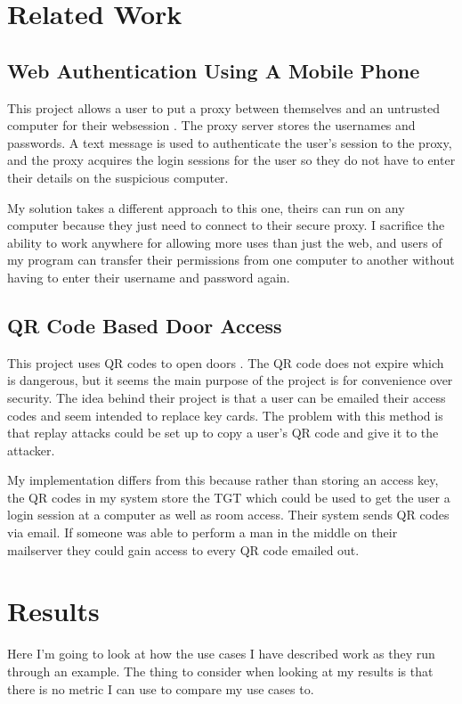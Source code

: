 \documentclass[]{report}   %
\begin{document}
\section{Related Work}
\subsection {Web Authentication Using A Mobile Phone}
This project allows a user to put a proxy between themselves and an untrusted computer for their websession \cite{Wu04secureweb}. The proxy server stores the usernames and passwords. A text message is used to authenticate the user's session to the proxy, and the proxy acquires the login sessions for the user so they do not have to enter their details on the suspicious computer.

My solution takes a different approach to this one, theirs can run on any computer because they just need to connect to their secure proxy. I sacrifice the ability to work anywhere for allowing more uses than just the web, and users of my program can transfer their permissions from one computer to another without having to enter their username and password again.

\subsection{QR Code Based Door Access}
This project uses QR codes to open doors \cite{QRRelated}. The QR code does not expire which is dangerous, but it seems the main purpose of the project is for convenience over security. The idea behind their project is that a user can be emailed their access codes and seem intended to replace key cards. The problem with this method is that replay attacks could be set up to copy a user's QR code and give it to the attacker.

My implementation differs from this because rather than storing an access key, the QR codes in my system store the TGT which could be used to get the user a login session at a computer as well as room access. Their system sends QR codes via email. If someone was able to perform a man in the middle on their mailserver they could gain access to every QR code emailed out.


\section{Results}
Here I'm going to look at how the use cases I have described work as they run through an example. The thing to consider when looking at my results is that there is no metric I can use to compare my use cases to.
\end{document}
